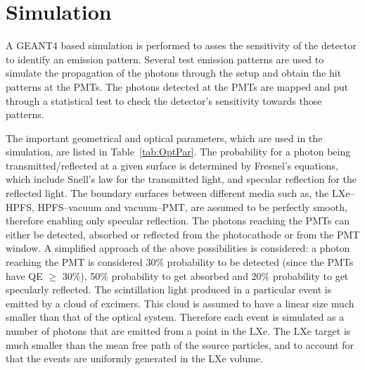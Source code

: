 \section{Simulation}
\label{sec:sim}
A GEANT4 based simulation is performed to asses the sensitivity of the detector to identify 
an emission pattern. Several test emission patterns are used to simulate the propagation of the 
photons through the setup and obtain the hit patterns at the PMTs. The photons detected at the 
PMTs are mapped and put through a statistical test to check the detector's sensitivity towards 
those patterns.

The important geometrical and optical parameters, which are used in the simulation, 
are listed in Table~\ref{tab:OptPar}. The probability for a photon being 
transmitted/reflected at a given surface is 
determined by Fresnel's equations, which include Snell's law for the transmitted light, 
and specular reflection for the reflected light. The boundary surfaces between different media
such as, the LXe--HPFS, HPFS--vacuum and vacuum--PMT, are assumed to be perfectly smooth, 
therefore enabling only specular reflection. 
The photons reaching the PMTs can either be detected, absorbed or reflected from the photocathode 
or from the PMT window. A simplified approach of the above possibilities is considered:
a photon reaching the PMT is considered 30\% probability to be detected (since the PMTs have QE $\geq$ 30\%), 
50\% probability to get absorbed and 20\% probability to get specularly reflected. 
The scintillation light produced in a particular 
event is emitted by a cloud of excimers. This cloud is assumed to have a linear size much smaller than that 
of the optical system. Therefore each event is simulated as a number of photons that are emitted from a point 
in the LXe. The LXe target is much smaller than the mean free path of the source particles, and to 
account for that the events are uniformly generated in the LXe volume.

